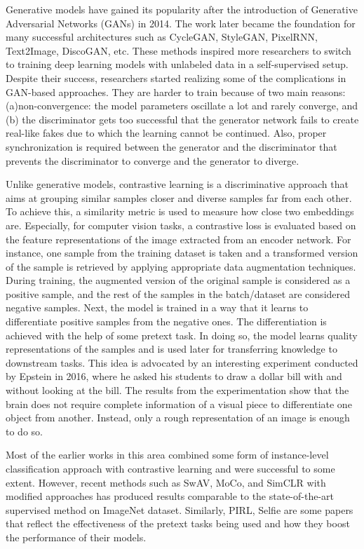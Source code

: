 \documentclass[conference]{IEEEtran}
\begin{document}
Generative models have gained its popularity after the introduction of Generative Adversarial Networks (GANs) in 2014. The work later became the foundation for many successful architectures such as CycleGAN, StyleGAN, PixelRNN, Text2Image, DiscoGAN, etc.
These methods inspired more researchers to switch to training deep learning models with unlabeled data in a self-supervised setup.
Despite their success, researchers started realizing some of the complications in GAN-based approaches.
They are harder to train because of two main reasons: (a)non-convergence: the model parameters oscillate a lot and rarely converge, and (b) the discriminator gets too successful that the generator network fails to create real-like fakes due to which the learning cannot be continued.
Also, proper synchronization is required between the generator and the discriminator that prevents the discriminator to converge and the generator to diverge.

Unlike generative models, contrastive learning is a discriminative approach that aims at grouping similar samples closer and diverse samples far from each other.
To achieve this, a similarity metric is used to measure how close two embeddings are. 
Especially, for computer vision tasks, a contrastive loss is evaluated based on the feature representations of the image extracted from an encoder network.
For instance, one sample from the training dataset is taken and a transformed version of the sample is retrieved by applying appropriate data augmentation techniques.
During training, the augmented version of the original sample is considered as a positive sample, and the rest of the samples in the batch/dataset are considered negative samples.
Next, the model is trained in a way that it learns to differentiate positive samples from the negative ones.
The differentiation is achieved with the help of some pretext task. In doing so, the model learns quality representations of the samples and is used later for transferring knowledge to downstream tasks.
This idea is advocated by an interesting experiment conducted by Epstein in 2016, where he asked his students to draw a dollar bill with and without looking at the bill.
The results from the experimentation show that the brain does not require complete information of a visual piece to differentiate  one object from another. Instead, only a rough representation of an image is enough to do so.

Most of the earlier works in this area combined some form of instance-level classification approach with contrastive learning and were successful to some extent. However, recent methods such as SwAV, MoCo, and SimCLR with modified approaches has produced results comparable to the state-of-the-art supervised method on ImageNet dataset.
Similarly, PIRL, Selfie are some papers that reflect the effectiveness of the pretext tasks being used and how they boost the performance of their models.
\end{document}
